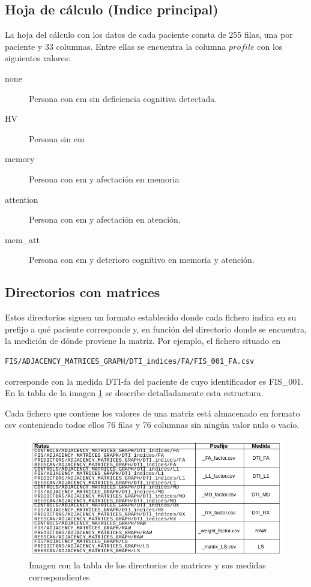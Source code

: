 \subsection{Hoja de cálculo (Indice principal)}
La hoja del cálculo con los datos de cada paciente consta de 255 filas, una por paciente
y 33 columnas. Entre ellas se encuentra la columna $profile$ con los siguientes valores:

\begin{description}
\item [none] Persona con \gls{em} sin deficiencia cognitiva detectada.
\item [HV] Persona sin \gls{em}
\item [memory] Persona con \gls{em} y afectación en memoria
\item [attention] Persona con \gls{em} y afectación en atención.
\item [mem\_att] Persona con \gls{em} y deterioro cognitivo en memoria y atención.
\end{description}

\subsection{Directorios con matrices}
Estos directorios siguen un formato establecido donde cada fichero indica en su prefijo a qué paciente corresponde y, en función del directorio donde se encuentra, la medición de dónde proviene la matriz. Por ejemplo, el fichero situado en
\begin{lstlisting}
FIS/ADJACENCY_MATRICES_GRAPH/DTI_indices/FA/FIS_001_FA.csv
\end{lstlisting}
corresponde con la medida DTI-\gls{fa} del paciente de cuyo identificador es FIS\_001. En la tabla de la imagen \ref{figure:rutas} se describe detalladamente esta estructura.

Cada fichero que contiene los valores de una matriz está almacenado en formato \gls{csv} conteniendo todos ellos 76 filas y 76 columnas sin ningún valor nulo o vacío.

\begin{figure}[H]
\centering
\includegraphics[width=1\textwidth]{figs/datos/rutas.png}
\caption{Imagen con la tabla de los directorios de matrices y sus medidas correspondientes}
\label{figure:rutas}
\end{figure}

